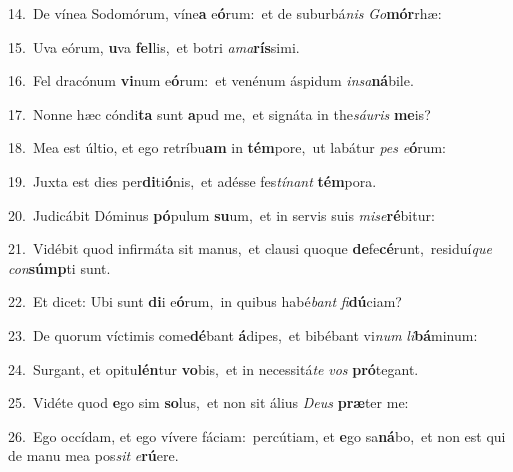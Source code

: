 {\numbfont\textcolor{\numbcolor}{14.}}~De vínea Sodomórum, víne\textbf{a} e\-\textbf{ó}\-rum:~\star et de suburbá\textit{nis} \textit{Go}\-\textbf{mór}rhæ:\par
{\numbfont\textcolor{\numbcolor}{15.}}~Uva eórum, \textbf{u}\-va \textbf{fel}\-lis,~\star et botri \textit{a}\-\textit{ma}\textbf{rís}simi.\par
{\numbfont\textcolor{\numbcolor}{16.}}~Fel dracónum \textbf{vi}\-num e\-\textbf{ó}\-rum:~\star et venénum áspidum \textit{in}\-\textit{sa}\textbf{ná}bile.\par
{\numbfont\textcolor{\numbcolor}{17.}}~Nonne hæc cóndi\textbf{ta} sunt \textbf{a}\-pud me,~\star et signáta in the\-\textit{sáu}\-\textit{ris} \textbf{me}\-is?\par
{\numbfont\textcolor{\numbcolor}{18.}}~Mea est últio, et ego retríbu\textbf{am} in \textbf{tém}\-pore,~\star ut labátur \textit{pes} \textit{e}\-\textbf{ó}rum:\par
{\numbfont\textcolor{\numbcolor}{19.}}~Juxta est dies per\-\textbf{di}\-ti\-\textbf{ó}\-nis,~\star et adésse fes\-\textit{tí}\-\textit{nant} \textbf{tém}\-pora.\par
{\numbfont\textcolor{\numbcolor}{20.}}~Judicábit Dóminus \textbf{pó}\-pulum \textbf{su}\-um,~\star et in servis suis \textit{mi}\-\textit{se}\textbf{ré}bitur:\par
{\numbfont\textcolor{\numbcolor}{21.}}~Vidébit quod infirmáta sit manus,~\dagger et clausi quoque \textbf{de}\-fe\-\textbf{cé}\-runt,~\star residuí\textit{que} \textit{con}\-\textbf{súmp}ti sunt.\par
{\numbfont\textcolor{\numbcolor}{22.}}~Et dicet: Ubi sunt \textbf{di}\-i e\-\textbf{ó}\-rum,~\star in quibus habé\textit{bant} \textit{fi}\-\textbf{dú}ciam?\par
{\numbfont\textcolor{\numbcolor}{23.}}~De quorum víctimis come\-\textbf{dé}\-bant \textbf{á}\-dipes,~\star et bibébant vi\textit{num} \textit{li}\-\textbf{bá}minum:\par
{\numbfont\textcolor{\numbcolor}{24.}}~Surgant, et opitu\-\textbf{lén}\-tur \textbf{vo}\-bis,~\star et in necessitá\textit{te} \textit{vos} \textbf{pró}\-tegant.\par
{\numbfont\textcolor{\numbcolor}{25.}}~Vidéte quod \textbf{e}\-go sim \textbf{so}\-lus,~\star et non sit álius \textit{De}\-\textit{us} \textbf{præ}\-ter me:\par
{\numbfont\textcolor{\numbcolor}{26.}}~Ego occídam, et ego vívere fáciam:~\dagger percútiam, et \textbf{e}\-go sa\-\textbf{ná}\-bo,~\star et non est qui de manu mea pos\textit{sit} \textit{e}\-\textbf{rú}ere.\par
